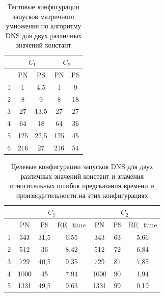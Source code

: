 			\begin{table}
				\centering
				\begin{tabular}{|r||c|c||c|c|}
					\hline
					            & \multicolumn{2}{c||}{\(C_1\)} & \multicolumn{2}{c|}{\(C_2\)}  \\ \hline
					\textnumero & PN  & PS                      & PN  & PS                      \\ \hline
					1           & 1   & 4,5                     & 1   & 9                       \\ \hline
					2           & 8   & 9                       & 8   & 18                      \\ \hline
					3           & 27  & 13,5                    & 27  & 27                      \\ \hline
					4           & 64  & 18                      & 64  & 36                      \\ \hline
					5           & 125 & 22,5                    & 125 & 45                      \\ \hline
					6           & 216 & 27                      & 216 & 54                      \\ \hline
				\end{tabular}
				\caption{Тестовые конфигурации запусков матричного умножения по алгоритму DNS для двух различных значений констант}
				\label{test_DNS}
			\end{table}

			\begin{table}
				\centering
				\begin{tabular}{|r||c|c|c||c|c|c|}
					\hline
					            & \multicolumn{3}{|c|}{\(C_1\)} & \multicolumn{3}{|c|}{\(C_2\)} \\ \hline
					\textnumero & PN   & PS   & RE\_time        & PN   & PS & RE\_time          \\ \hline
					1           & 343  & 31,5 & 6,55            & 343  & 63 & 5,66              \\ \hline
					2           & 512  & 36   & 8,42            & 512  & 72 & 6,84              \\ \hline
					3           & 729  & 40,5 & 9,35            & 729  & 81 & 7,85              \\ \hline
					4           & 1000 & 45   & 7,94            & 1000 & 90 & 1,94              \\ \hline
					5           & 1331 & 49,5 & 9,63            & 1331 & 99 & 0,19              \\ \hline
				\end{tabular}
				\caption{Целевые конфигурации запусков DNS для двух различных значений констант и значения относительных ошибок предсказания времени и производительности на этих конфигурациях}
				\label{target_DNS}
			\end{table}

